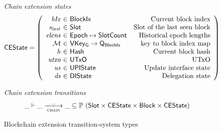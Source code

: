 \documentclass[11pt,a4paper]{article}
\newcommand{\powerset}[1]{\mathbb{P}~#1}
\newcommand{\var}[1]{\mathit{#1}}
\newcommand{\type}[1]{\mathsf{#1}}
\newcommand{\trans}[2]{\xlongrightarrow[\textsc{#1}]{#2}}
\newcommand{\totalf}{\to}
\newcommand{\partialf}{\mapsto}
\newcommand{\Hash}{\type{Hash}}  %
\newcommand{\Slot}{\type{Slot}}
\newcommand{\SlotCount}{\type{SlotCount}}
\newcommand{\BlockIx}{\type{BlockIx}}
\newcommand{\Block}{\type{Block}}
\newcommand{\Queue}{\type{Q}}
\newcommand{\VKeyGen}{\type{VKey_G}}
\newcommand{\signmapname}{\mathcal{M}}
\begin{document}
\begin{figure}[ht]
  \emph{Chain extension states}
  \begin{equation*}
    \CEState =
    \left(
      \begin{array}{r@{~\in~}lr}
        \var{bIx} & \BlockIx & \text{Current block index} \\
        \var{s_{last}} & \Slot & \text{Slot of the last seen block} \\
        \var{elens} & \Epoch \partialf \SlotCount & \text{Historical epoch lengths} \\
        \signmapname & \VKeyGen \totalf \Queue_\BlockIx & \text{key to block index map} \\
        \var{h} & \Hash & \text{Current block hash} \\
        \var{utxo} & \UTxO & \text{UTxO} \\
        \var{us} & \UPIState & \text{Update interface state} \\
        \var{ds} & \DIState & \text{Delegation state}
      \end{array}
    \right)
  \end{equation*}

  \emph{Chain extension transitions}
  \begin{equation*}
    \_ \vdash \var{\_} \trans{chain}{\_} \var{\_} \subseteq
    \powerset (\Slot \times \CEState \times \Block \times \CEState)
  \end{equation*}

  \caption{Blockchain extension transition-system types}
  \label{fig:ts-types:chain-extension}
\end{figure}
\end{document}
